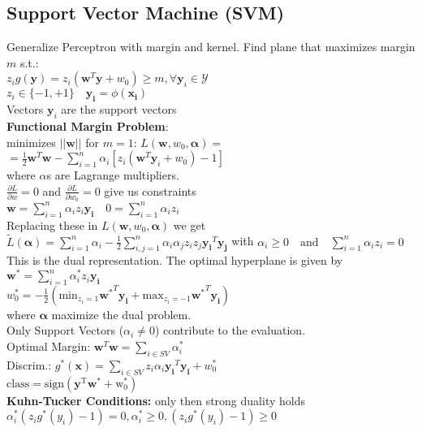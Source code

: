 \subsection*{Support Vector Machine (SVM)}
Generalize Perceptron with margin and kernel.
Find plane that maximizes margin $m$ s.t.:\\
$z_ig(\mathbf{y})=z_i(\mathbf{w}^T\mathbf{y}+w_0)\geq m,\forall \mathbf{y}_i \in \mathcal{Y}$\\
$z_i \in \{-1,+1\}\quad \mathbf{y_i} = \phi(\mathbf{x_i})$\\
Vectors $\mathbf{y}_i$ are the support vectors \\
\textbf{Functional Margin Problem}:\\
minimizes $||\mathbf{w}||$ for $m{=}1$: 
$L(\mathbf{w}, w_0, \mathbf{\alpha}) {=}$\\
$=\frac{1}{2}\mathbf{w}^T\mathbf{w}{-}\sum_{i=1}^n\alpha_i[z_i(\mathbf{w}^T\mathbf{y}_i{}+w_0){-}1]$\\
where $\alpha$s are Lagrange multipliers.\\
$\frac{\partial L}{\partial w} {=} 0$ and $\frac{\partial L}{\partial w_0} {=} 0$ give us constraints\\
$\mathbf{w}=\sum_{i=1}^n\alpha_iz_i\mathbf{y_i} \quad 0=\sum_{i=1}^n\alpha_iz_i$\\
Replacing these in $L(\mathbf{w}, w_0, \mathbf{\alpha})$ we get\\
$\tilde{L}(\mathbf{\alpha}){=}\sum_{i=1}^n\alpha_i{-}\frac{1}{2}\sum_{i,j=1}^n\alpha_i\alpha_jz_iz_j\mathbf{y_i}^T\mathbf{y_j}$
with $\alpha_i\geq0\quad\mathrm{and}\quad\sum_{i=1}^n\alpha_iz_i=0$\\
This is the dual representation.
The optimal hyperplane is given by\\
$\mathbf{w^*}=\sum_{i=1}^n\alpha_i^*z_i\mathbf{y_i}$\\
$ w_0^*{=}{-}\frac{1}{2}(\mathrm{min}_{z_i=1}\mathbf{w^*}^T\mathbf{y_i}{+}\mathrm{max}_{z_i=-1}\mathbf{w^*}^T\mathbf{y_i})$\\
where $\mathbf{\alpha}$ maximize the dual problem.\\
Only Support Vectors ($\alpha_i\not=0$) contribute to the evaluation.\\
Optimal Margin: $\mathbf{w}^T\mathbf{w}=\sum_{i\in SV}\alpha_i^*$\\
Discrim.: $g^*(\mathbf{x}){=}\sum_{i\in SV}z_i\alpha_i\mathbf{y_i}^T\mathbf{y_i}{+}w^*_0$\\
$\mathrm{class} = \mathrm{sign(\mathbf{y}^T\mathbf{w}^*+w_0^*)}$ \\
\textbf{Kuhn-Tucker Conditions:} only then strong duality holds\\
$\alpha_i^*(z_ig^*(y_i)-1)= 0, \alpha_i^* \geq 0, (z_ig^*(y_i)-1) \geq 0$


